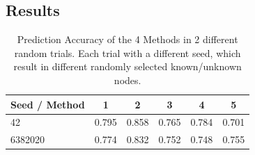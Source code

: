 \documentclass[a4paper,10pt]{article}
\theoremstyle{definition}
\theoremstyle{remark}
\theoremstyle{plain}
\begin{document}

\subsection{Results}

\begin{table}[!htb]
\caption{Prediction Accuracy of the 4 Methods in 2 different random
trials. Each trial with a different seed, which result in different randomly
selected known/unknown nodes.} 
\begin{center}
\begin{tabular}{ | l | c | c | c | c | c | }
\hline
Seed / Method & 1 & 2 & 3 & 4 & 5\\
\hline
42 & 0.795 & 0.858 & 0.765 &
0.784 & 0.701\\
6382020 & 0.774 & 0.832 & 0.752 & 0.748 & 0.755\\
\hline
\end{tabular}
\label{table:results_5_prediction_methods}
\end{center}
\end{table}
\end{document}
